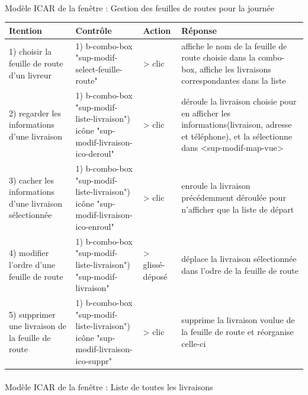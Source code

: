\documentclass{report}
\begin{document}
\paragraph{}
Modèle ICAR de la fenêtre : Gestion des feuilles de routes pour la journée

\begin{longtable}{|p{3cm}|p{4cm}|p{2cm}|p{5cm}|}
\hline
Itention&Contrôle&Action&Réponse\\\hline
1) choisir la feuille de route d'un livreur&1) b-combo-box \newline
"sup-modif-select-feuille-route"&> clic&affiche le nom de la feuille de route choisie dans la combo-box, affiche les livraisons correspondantes dans la liste \\\hline
2) regarder les informations d'une livraison&1) b-combo-box\newline
"sup-modif-liste-livraison"\newline
2) icône\newline
"sup-modif-livraison-ico-deroul"&> clic&déroule la livraison choisie pour en afficher les informations(livraison, adresse et téléphone), et la sélectionne dans <sup-modif-map-vue>\\\hline
3) cacher les informations d'une livraison sélectionnée&1) b-combo-box\newline
"sup-modif-liste-livraison"\newline
2) icône\newline
"sup-modif-livraison-ico-enroul"&> clic&enroule la livraison précédemment déroulée pour n'afficher que la liste de départ\\\hline
4) modifier l'ordre d'une feuille de route&1) b-combo-box\newline
"sup-modif-liste-livraison"\newline
2) "sup-modif-livraison"&> glissé-déposé&déplace la livraison sélectionnée dans l'odre de la feuille de route\\\hline
5) supprimer une livraison de la feuille de route&1) b-combo-box\newline
"sup-modif-liste-livraison"\newline
2) icône\newline
"sup-modif-livraison-ico-suppr"&> clic&supprime la livraison voulue de la feuille de route et réorganise celle-ci\\\hline
\end{longtable}

\paragraph{}
Modèle ICAR de la fenêtre : Liste de toutes les livraisons
\end{document}
